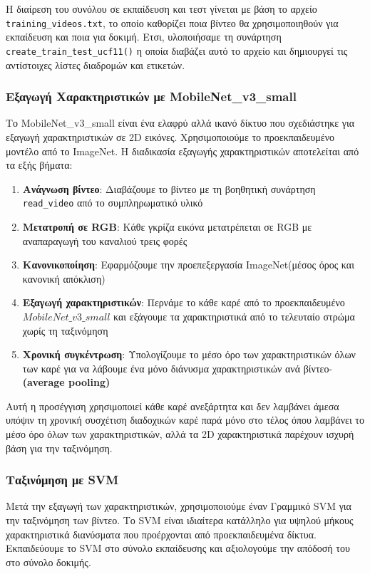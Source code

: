 \documentclass[12pt, a4paper]{article}
\begin{document}
Η διαίρεση του συνόλου σε εκπαίδευση και τεστ γίνεται με βάση το αρχείο \texttt{training\_videos.txt}, το οποίο καθορίζει ποια βίντεο θα χρησιμοποιηθούν για εκπαίδευση και ποια για δοκιμή. Ετσι, υλοποιήσαμε τη συνάρτηση \texttt{create\_train\_test\_ucf11()}  η οποία διαβάζει αυτό το αρχείο και δημιουργεί τις αντίστοιχες λίστες διαδρομών και ετικετών.

\subsubsection{Εξαγωγή Χαρακτηριστικών με MobileNet\_v3\_small}

Το MobileNet\_v3\_small είναι ένα ελαφρύ αλλά ικανό δίκτυο που σχεδιάστηκε για εξαγωγή χαρακτηριστικών σε 2D εικόνες. Χρησιμοποιούμε το προεκπαιδευμένο μοντέλο από το ImageNet. Η διαδικασία εξαγωγής χαρακτηριστικών αποτελείται από τα εξής βήματα:

\begin{enumerate}
    \item \textbf{Ανάγνωση βίντεο}: Διαβάζουμε το βίντεο με τη βοηθητική συνάρτηση \texttt{read\_video} από το συμπληρωματικό υλικό
    \item \textbf{Μετατροπή σε RGB}: Κάθε γκρίζα εικόνα μετατρέπεται σε RGB με αναπαραγωγή του καναλιού τρεις φορές
    \item \textbf{Κανονικοποίηση}: Εφαρμόζουμε την προεπεξεργασία ImageNet(μέσος όρος και κανονική απόκλιση)
    \item \textbf{Εξαγωγή χαρακτηριστικών}: Περνάμε το κάθε καρέ από το  προεκπαιδευμένο $MobileNet\_v3\_small$ και εξάγουμε τα χαρακτηριστικά από το τελευταίο στρώμα χωρίς τη ταξινόμηση
    \item \textbf{Χρονική συγκέντρωση}: Υπολογίζουμε το μέσο όρο των χαρακτηριστικών όλων των καρέ για να λάβουμε ένα μόνο διάνυσμα χαρακτηριστικών ανά βίντεο- \textbf{(average pooling)}
\end{enumerate}

Αυτή η προσέγγιση χρησιμοποιεί κάθε καρέ ανεξάρτητα και δεν λαμβάνει άμεσα υπόψιν τη χρονική συσχέτιση διαδοχικών καρέ παρά μόνο στο τέλος όπου λαμβάνει το μέσο όρο όλων των χαρακτηριστικών, αλλά τα 2D χαρακτηριστικά παρέχουν ισχυρή βάση για την ταξινόμηση.

\subsubsection{Ταξινόμηση με SVM}

Μετά την εξαγωγή των χαρακτηριστικών, χρησιμοποιούμε έναν Γραμμικό SVM για την ταξινόμηση των βίντεο. Το SVM είναι ιδιαίτερα κατάλληλο για υψηλού μήκους χαρακτηριστικά διανύσματα που προέρχονται από προεκπαιδευμένα δίκτυα. Εκπαιδεύουμε το SVM στο σύνολο εκπαίδευσης και αξιολογούμε την απόδοσή του στο σύνολο δοκιμής.
\end{document}
